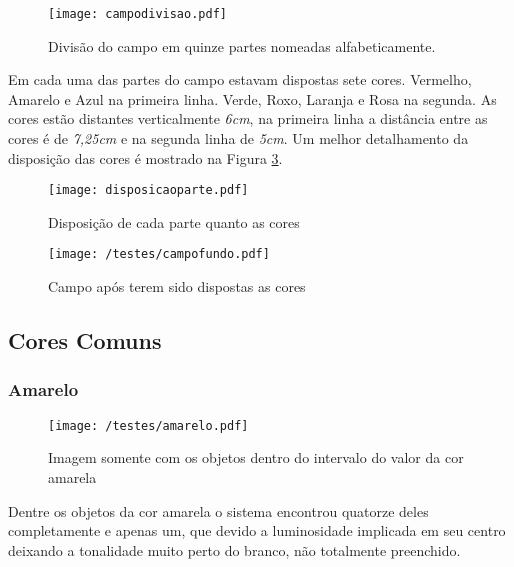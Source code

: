 \begin{figure}[H]
		\centering
		\texttt{[image: campodivisao.pdf]}
		\caption{Divisão do campo em quinze partes nomeadas alfabeticamente.}
		\label{campodivisao}
	\end{figure}
	
Em cada uma das partes do campo estavam dispostas sete cores. Vermelho, Amarelo e Azul na primeira linha. Verde, Roxo, Laranja e Rosa na segunda. As cores estão distantes verticalmente \textit{6cm}, na primeira linha a distância entre as cores é de \textit{7,25cm} e na segunda linha de \textit{5cm}. Um  melhor detalhamento da disposição das cores é mostrado na Figura \ref{disposicaoparte}.


\begin{figure}[H]
\begin{minipage}[b]{0.45\linewidth}
\centering
\texttt{[image: disposicaoparte.pdf]}
\caption{Disposição de cada parte quanto as cores}
\label{fig:figure1}
\end{minipage}
\hspace{0.5cm}
\begin{minipage}[b]{0.45\linewidth}
\centering
\texttt{[image: /testes/campofundo.pdf]}
\caption{Campo após terem sido dispostas as cores}
\label{fig:figure2}
\end{minipage}
\end{figure}

\subsection{Cores Comuns}
\subsubsection{Amarelo}
	\begin{figure}[H]
		\centering
		\texttt{[image: /testes/amarelo.pdf]}
		\caption{Imagem somente com os objetos dentro do intervalo do valor da cor amarela}
		\label{disposicaoparte}
	\end{figure}
	
	Dentre os objetos da cor amarela o sistema encontrou quatorze deles completamente e apenas um, que devido a luminosidade implicada em seu centro deixando a tonalidade muito perto do branco, não totalmente preenchido.
	
